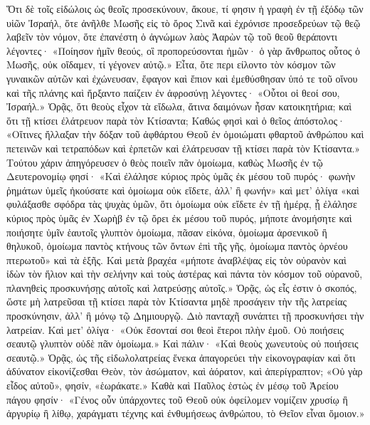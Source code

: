 \documentclass[10pt]{book}
\begin{document}
\begin{paracol}{2}
Ὅτι δὲ τοῖς εἰδώλοις ὡς θεοῖς προσεκύνουν, ἄκουε, τί φησιν ἡ γραφὴ ἐν τῇ
ἐξόδῳ τῶν υἱῶν Ἰσραήλ, ὅτε ἀνῆλθε Μωσῆς εἰς τὸ ὄρος Σινᾶ καὶ ἐχρόνισε
προσεδρεύων τῷ θεῷ λαβεῖν τὸν νόμον, ὅτε ἐπανέστη ὁ ἀγνώμων λαὸς Ἀαρὼν τῷ τοῦ
θεοῦ θεράποντι λέγοντες· «Ποίησον ἡμῖν θεούς, οἳ προπορεύσονται ἡμῶν· ὁ γὰρ
ἄνθρωπος οὗτος ὁ Μωσῆς, οὐκ οἴδαμεν, τί γέγονεν αὐτῷ.» Εἶτα, ὅτε περι είλοντο
τὸν κόσμον τῶν γυναικῶν αὐτῶν καὶ ἐχώνευσαν, ἔφαγον καὶ ἔπιον καὶ ἐμεθύσθησαν
ὑπό τε τοῦ οἴνου καὶ τῆς πλάνης καὶ ἤρξαντο παίζειν ἐν ἀφροσύνῃ λέγοντες·
«Οὗτοι οἱ θεοί σου, Ἰσραήλ.»
Ὁρᾷς, ὅτι θεοὺς εἶχον τὰ εἴδωλα, ἅτινα δαιμόνων ἦσαν κατοικητήρια;
καὶ ὅτι τῇ κτίσει ἐλάτρευον παρὰ τὸν Κτίσαντα;
Καθώς φησὶ καὶ ὁ θεῖος ἀπόστολος·
«Οἵτινες ἤλλαξαν τὴν δόξαν τοῦ ἀφθάρτου Θεοῦ ἐν ὁμοιώματι
φθαρτοῦ ἀνθρώπου καὶ πετεινῶν καὶ τετραπόδων καὶ ἑρπετῶν
καὶ ἐλάτρευσαν τῇ κτίσει παρὰ τὸν Κτίσαντα.»
Τούτου χάριν ἀπηγόρευσεν ὁ θεὸς ποιεῖν πᾶν ὁμοίωμα,
καθὼς Μωσῆς ἐν τῷ Δευτερονομίῳ φησί·
«Καὶ ἐλάλησε κύριος πρὸς ὑμᾶς ἐκ μέσου τοῦ πυρός·
φωνὴν ῥημάτων ὑμεῖς ἠκούσατε καὶ ὁμοίωμα οὐκ εἴδετε, ἀλλ’ ἢ φωνήν»
καὶ μετ’ ὀλίγα «καὶ φυλάξασθε σφόδρα τὰς ψυχὰς ὑμῶν, ὅτι ὁμοίωμα οὐκ εἴδετε
ἐν τῇ ἡμέρᾳ, ᾗ ἐλάλησε κύριος πρὸς ὑμᾶς ἐν Χωρὴβ ἐν τῷ ὄρει ἐκ μέσου τοῦ
πυρός, μήποτε ἀνομήσητε καὶ ποιήσητε ὑμῖν ἑαυτοῖς γλυπτὸν ὁμοίωμα, πᾶσαν
εἰκόνα, ὁμοίωμα ἀρσενικοῦ ἢ θηλυκοῦ, ὁμοίωμα παντὸς κτήνους τῶν ὄντων ἐπὶ τῆς
γῆς, ὁμοίωμα παντὸς ὀρνέου πτερωτοῦ»
καὶ τὰ ἑξῆς.
Καὶ μετὰ βραχέα «μήποτε ἀναβλέψας εἰς τὸν οὐρανὸν καὶ ἰδὼν τὸν ἥλιον καὶ τὴν
σελήνην καὶ τοὺς ἀστέρας καὶ πάντα τὸν κόσμον τοῦ οὐρανοῦ, πλανηθεὶς
προσκυνήσῃς αὐτοῖς καὶ λατρεύσῃς αὐτοῖς.»
Ὁρᾷς, ὡς εἷς ἐστιν ὁ σκοπός, ὥστε μὴ λατρεῦσαι τῇ κτίσει παρὰ τὸν Κτίσαντα
μηδὲ προσάγειν τὴν τῆς λατρείας προσκύνησιν, ἀλλ’ ἢ μόνῳ τῷ Δημιουργῷ. Διὸ
πανταχῆ συνάπτει τῇ προσκυνήσει τὴν λατρείαν.
Καὶ μετ’ ὀλίγα· «Οὐκ ἔσονταί σοι θεοὶ ἕτεροι πλὴν ἐμοῦ.
Οὐ ποιήσεις σεαυτῷ γλυπτὸν οὐδὲ πᾶν ὁμοίωμα.»
Καὶ πάλιν· «Καὶ θεοὺς χωνευτοὺς οὐ ποιήσεις σεαυτῷ.»
Ὁρᾷς, ὡς τῆς εἰδωλολατρείας ἕνεκα ἀπαγορεύει τὴν εἰκονογραφίαν καὶ ὅτι
ἀδύνατον εἰκονίζεσθαι Θεὸν, τὸν ἀσώματον, καὶ ἀόρατον, καὶ ἀπερίγραπτον;
«Οὐ γὰρ εἶδος αὐτοῦ», φησίν, «ἑωράκατε.»
Καθὰ καὶ Παῦλος ἑστὼς ἐν μέσῳ τοῦ Ἀρείου πάγου φησίν· «Γένος οὖν ὑπάρχοντες
τοῦ Θεοῦ οὐκ ὀφείλομεν νομίζειν χρυσίῳ ἢ ἀργυρίῳ ἢ λίθῳ, χαράγματι τέχνης καὶ
ἐνθυμήσεως ἀνθρώπου, τὸ Θεῖον εἶναι ὅμοιον.»


\end{paracol}
\end{document}

